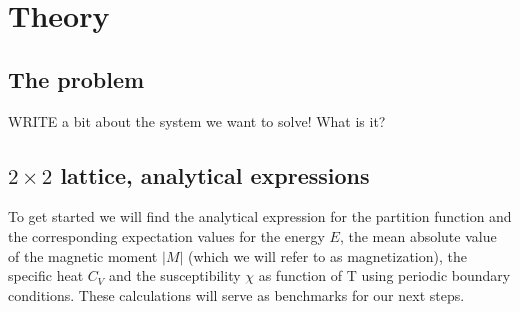 \documentclass[../main.tex]{subfiles}
\begin{document}
\section{Theory}
\subsection{The problem}
WRITE a bit about the system we want to solve! What is it?

\subsection{$2 \times 2$ lattice, analytical expressions} \label{sec:theory-analy}
To get started we will find the analytical expression for the partition function and the corresponding expectation values for the energy $E$, the mean absolute value of the magnetic moment $|M|$ (which we will refer to as magnetization), the specific heat $C_V$ and the susceptibility $\chi$ as function of T using periodic boundary conditions. These calculations will serve as benchmarks for our next steps.

\end{document}
